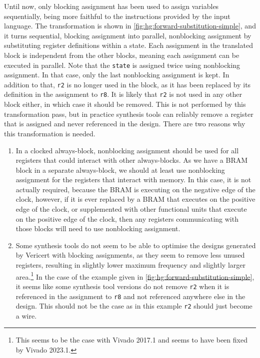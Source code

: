 Until now, only blocking assignment has been used to assign variables
sequentially, being more faithful to the instructions provided by the input
language.  The transformation is shown in
\cref{fig:hg:forward-substitution-simple}, and it turns sequential, blocking
assignment into parallel, nonblocking assignment by substituting register
definitions within a state.  Each assignment in the translated block is
independent from the other blocks, meaning each assignment can be executed in
parallel.  Note that the \texttt{state} is assigned twice using nonblocking
assignment.  In that case, only the last nonblocking assignment is kept.  In
addition to that, \texttt{r2} is no longer used in the block, as it has been
replaced by its definition in the assignment to \texttt{r8}.  It is likely that
\texttt{r2} is not used in any other block either, in which case it should be
removed.  This is not performed by this transformation pass, but in practice
synthesis tools can reliably remove a register that is assigned and never
referenced in the design.  There are two reasons why this transformation is
needed.

\begin{enumerate}
\item In a clocked always-block, nonblocking assignment should be used for all
  registers that could interact with other always-blocks.  As we have a
  \gls{BRAM} block in a separate always-block, we should at least use
  nonblocking assignment for the registers that interact with memory.  In this
  case, it is not actually required, because the \gls{BRAM} is executing on the
  negative edge of the clock, however, if it is ever replaced by a \gls{BRAM}
  that executes on the positive edge of the clock, or supplemented with other
  functional units that execute on the positive edge of the clock, then any
  registers communicating with those blocks will need to use nonblocking
  assignment.
\item Some synthesis tools do not seem to be able to optimise the designs
  generated by Vericert with blocking assignments, as they seem to remove less
  unused registers, resulting in slightly lower maximum frequency and slightly
  larger area.\footnote{This seems to be the case with Vivado 2017.1 and seems
    to have been fixed by Vivado 2023.1.}  In the case of the example given in
  \cref{fig:hg:forward-substitution-simple}, it seems like some synthesis tool
  versions do not remove \texttt{r2} when it is referenced in the assignment to
  \texttt{r8} and not referenced anywhere else in the design.  This should not
  be the case as in this example \texttt{r2} should just become a wire.
\end{enumerate}

